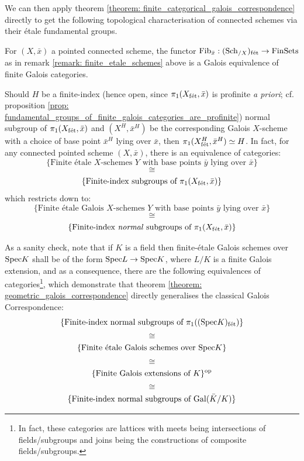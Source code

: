             We can then apply theorem \ref{theorem: finite_categorical_galois_correspondence} directly to get the following topological characterisation of connected schemes via their \'etale fundamental groups.
            \begin{theorem} \label{theorem: geometric_galois_correspondence}
                For $(X, \bar{x})$ a pointed connected scheme, the functor $\mathrm{Fib}_{\bar{x}}: (\mathrm{Sch}_{/X})_{\mathrm{f\acute{e}t}} \to \mathrm{Fin}\mathrm{Sets}$ as in remark \ref{remark: finite_etale_schemes} above is a Galois equivalence of finite Galois categories. 
            \end{theorem}
            \begin{corollary}
                Should $H$ be a finite-index (hence open, since $\pi_1(X_{\mathrm{f\acute{e}t}}, \bar{x})$ is profinite \textit{a priori}; cf. proposition \ref{prop: fundamental_groups_of_finite_galois_categories_are_profinite}) normal subgroup of $\pi_1(X_{\mathrm{f\acute{e}t}}, \bar{x})$ and $(X^H, \bar{x}^H)$ be the corresponding Galois $X$-scheme with a choice of base point $\bar{x}^H$ lying over $\bar{x}$, then $\pi_1(X^H_{\mathrm{f\acute{e}t}}, \bar{x}^H) \simeq H$. In fact, for any connected pointed scheme $(X, \bar{x})$, there is an equivalence of categories:
                    $$\{\text{Finite \'etale $X$-schemes $Y$ with base points $\bar{y}$ lying over $\bar{x}$}\}$$
                    $$\cong$$
                    $$\{\text{Finite-index subgroups of $\pi_1(X_{\mathrm{f\acute{e}t}}, \bar{x})$}\}$$
                which restricts down to:
                    $$\{\text{Finite \'etale Galois $X$-schemes $Y$ with base points $\bar{y}$ lying over $\bar{x}$}\}$$
                    $$\cong$$
                    $$\{\text{Finite-index \textit{normal} subgroups of $\pi_1(X_{\mathrm{f\acute{e}t}}, \bar{x})$}\}$$
            \end{corollary}
            \begin{example} \label{example: etale_fundamental_group_of_a_field}
                As a sanity check, note that if $K$ is a field then finite-\'etale Galois schemes over $\mathrm{Spec} K$ shall be of the form $\mathrm{Spec} L \to \mathrm{Spec} K$, where $L/K$ is a finite Galois extension, and as a consequence, there are the following equivalences of categories\footnote{In fact, these categories are lattices with meets being intersections of fields/subgroups and joins being the constructions of composite fields/subgroups.}, which demonstrate that theorem \ref{theorem: geometric_galois_correspondence} directly generalises the classical Galois Correspondence:
                    $$\{\text{Finite-index normal subgroups of $\pi_1((\mathrm{Spec} K)_{\mathrm{f\acute{e}t}})$}\}$$
                    $$\cong$$
                    $$\{\text{Finite \'etale Galois schemes over $\mathrm{Spec} K$}\}$$
                    $$\cong$$
                    $$\{\text{Finite Galois extensions of $K$}\}^{\mathrm{op}}$$
                    $$\cong$$
                    $$\{\text{Finite-index normal subgroups of $\mathrm{Gal}(\bar{K}/K)$}\}$$
            \end{example}
